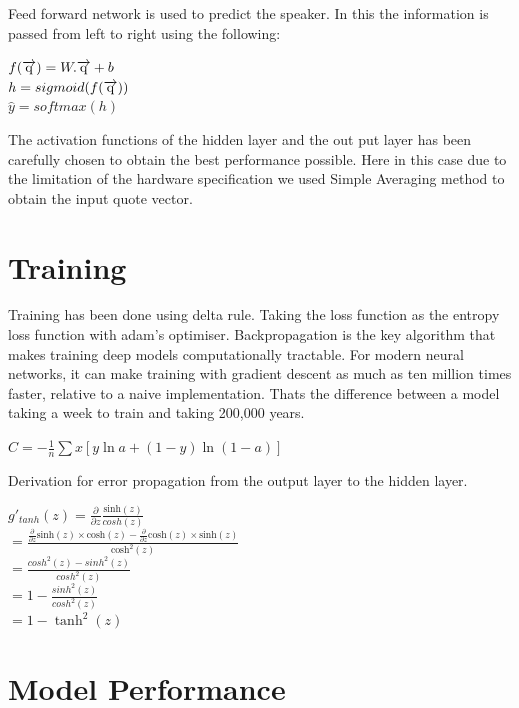 \documentclass[BTech]{srmuthesis}
\begin{document}
Feed forward network is used to predict the speaker. In this the information is passed from left to right using the following:

\begin{center}
	$f(\overrightarrow{\rm q}) = W.\overrightarrow{\rm q} + b$\\
	$h = sigmoid(f(\overrightarrow{\rm q}))$\\
	$\hat{y} = softmax(h)$
\end{center}

The activation functions of the hidden layer and the out put layer has been carefully chosen to obtain the best performance possible. Here in this case due to the limitation of the hardware specification we used Simple Averaging method to obtain the input quote vector.

\section{Training}

Training has been done using delta rule. Taking the loss function as the entropy loss function with adam's optimiser. Backpropagation is the key algorithm that makes training deep models computationally tractable. For modern neural networks, it can make training with gradient descent as much as ten million times faster, relative to a naive implementation. Thats the difference between a model taking a week to train and taking 200,000 years.

\begin{center}
$C= -\frac{1}{n} \sum x [y \ln a+(1−y)\ln(1−a)]$
\end{center}

Derivation for error propagation from the output layer to the hidden layer.

\begin{center}
$g'_{tanh}(z) = \frac{\partial}{\partial z} \frac{\text{sinh}(z)}{cosh(z)}$ \\  
$= \frac{\frac{\partial}{\partial z} \text{sinh}(z) \times \text{cosh}(z) - \frac{\partial}{\partial z} \text{cosh}(z) \times \text{sinh}(z)}{\text{cosh}^2(z)}$ \\ 
$= \frac{cosh^2(z) - sinh^2(z)}{cosh^2(z)}$ \\  
$= 1 - \frac{sinh^2(z)}{cosh^2(z)}$ \\  
$= 1 - \tanh^2(z)$
\end{center}

\section{Model Performance}
\end{document}
